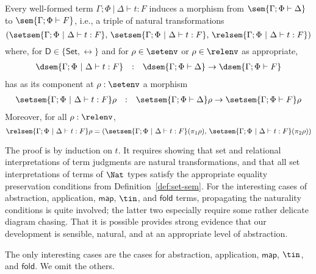 \documentclass{lmcs}
\theoremstyle{plain}\newtheorem{satz}[thm]{Satz}
\newcommand{\fold}{\mathsf{fold}}
\newcommand{\set}{\mathsf{Set}}
\newcommand{\map}{\mathsf{map}}
\begin{document}
\begin{thm}\label{thm:at-gen}
Every well-formed term $\Gamma;\Phi~|~\Delta \vdash t : F$ induces
a morphism from $\sem{\Gamma; \Phi \vdash \Delta}$ to
$\sem{\Gamma; \Phi \vdash F}$, i.e., a triple of natural
transformations 
\[(\setsem{\Gamma;\Phi~|~\Delta \vdash t : F},\,
\setsem{\Gamma;\Phi~|~\Delta \vdash t : F},\,
\relsem{\Gamma;\Phi~|~\Delta \vdash t : F})\]
where, for $\mathsf{D} \in \{\set,\rel\}$ and for $\rho \in \setenv$
or $\rho \in \relenv$ as appropriate,
\[\begin{array}{lll}
\dsem{\Gamma;\Phi~|~\Delta \vdash t : F} & : & \dsem{\Gamma;
  \Phi \vdash \Delta} \to \dsem{\Gamma; \Phi \vdash F}
\end{array}\]
has as its component at $\rho : \setenv$ a morphism
\[\begin{array}{lll}
\setsem{\Gamma;\Phi~|~\Delta \vdash t : F}\rho & : & \setsem{\Gamma;
  \Phi \vdash \Delta}\rho \to \setsem{\Gamma; \Phi \vdash F}\rho
\end{array}\]
\noindent
Moreover, for all $\rho : \relenv$, 
\begin{equation}\label{eq:projs}
\relsem{\Gamma;\Phi~|~\Delta \vdash t : F}\rho =
(\setsem{\Gamma;\Phi~|~\Delta \vdash t : F}(\pi_1 \rho),\,
\setsem{\Gamma;\Phi~|~\Delta \vdash t : F}(\pi_2 \rho))
\end{equation}
\end{thm}
\proof The proof is by induction on $t$. It requires showing that set
and relational interpretations of term judgments are natural
transformations, and that all set interpretations of terms of $\Nat$
types satisfy the appropriate equality preservation conditions from
Definition~\ref{def:set-sem}.  For the interesting cases of
abstraction, application, $\map$, $\tin$, and $\mathsf{fold}$ terms,
propagating the naturality conditions is quite involved; the latter
two especially require some rather delicate diagram chasing. That it
is possible provides strong evidence that our development is sensible,
natural, and at an appropriate level of abstraction.

The only interesting cases are the cases for abstraction, application,
$\map$, $\tin$, and $\fold$. We omit the others.
\end{document}
